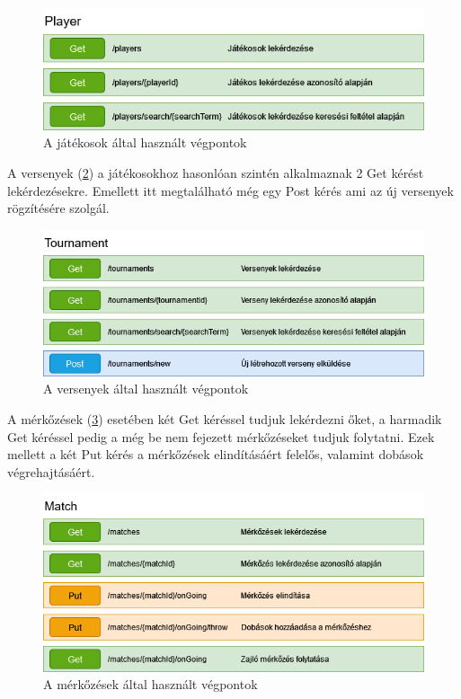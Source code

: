 \begin{figure}[h]
\centering
\includegraphics[scale=0.4]{images/Player_Vegpontok.drawio.png}
\caption{A játékosok által használt végpontok}
\label{fig:playerEndpoint}
\end{figure}

A versenyek (\ref{fig:tournamentEndpoint}) a játékosokhoz hasonlóan szintén alkalmaznak 2 Get kérést lekérdezésekre. Emellett itt megtalálható még egy Post kérés ami az új versenyek rögzítésére szolgál.

\begin{figure}[h]
\centering
\includegraphics[scale=0.4]{images/Tournament_Vegpontok.drawio.png}
\caption{A versenyek által használt végpontok}
\label{fig:tournamentEndpoint}
\end{figure}

A mérkőzések (\ref{fig:matchEndpoint}) esetében két Get kéréssel tudjuk lekérdezni őket, a harmadik Get kéréssel pedig a még be nem fejezett mérkőzéseket tudjuk folytatni. Ezek mellett a két Put kérés a mérkőzések elindításáért felelős, valamint dobások végrehajtásáért.

\begin{figure}[h]
\centering
\includegraphics[scale=0.4]{images/Merkozes_Vegpontok.drawio.png}
\caption{A mérkőzések által használt végpontok}
\label{fig:matchEndpoint}
\end{figure}